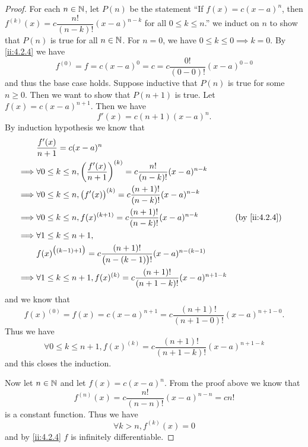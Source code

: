 \begin{proof}
  For each \(n \in \mathbb{N}\), let \(P(n)\) be the statement ``If \(f(x) = c (x - a)^n\), then \(f^{(k)}(x) = c \dfrac{n!}{(n - k)!} (x - a)^{n - k}\) for all \(0 \leq k \leq n\).''
  we induct on \(n\) to show that \(P(n)\) is true for all \(n \in \mathbb{N}\).
  For \(n = 0\), we have \(0 \leq k \leq 0 \implies k = 0\).
  By \cref{ii:4.2.4} we have
  \[
    f^{(0)} = f = c (x - a)^0 = c = c \dfrac{0!}{(0 - 0)!} (x - a)^{0 - 0}
  \]
  and thus the base case holds.
  Suppose inductive that \(P(n)\) is true for some \(n \geq 0\).
  Then we want to show that \(P(n + 1)\) is true.
  Let \(f(x) = c (x - a)^{n + 1}\).
  Then we have
  \[
    f'(x) = c (n + 1) (x - a)^n.
  \]
  By induction hypothesis we know that
  \begin{align*}
             & \dfrac{f'(x)}{n + 1} = c (x - a)^n                                                                                          \\
    \implies & \forall 0 \leq k \leq n, \bigg(\dfrac{f'(x)}{n + 1}\bigg)^{(k)} = c \dfrac{n!}{(n - k)!} (x - a)^{n - k}                    \\
    \implies & \forall 0 \leq k \leq n, \big(f'(x)\big)^{(k)} = c \dfrac{(n + 1)!}{(n - k)!} (x - a)^{n - k}                               \\
    \implies & \forall 0 \leq k \leq n, f(x)^{(k + 1)} = c \dfrac{(n + 1)!}{(n - k)!} (x - a)^{n - k}                   &  & \by{ii:4.2.4} \\
    \implies & \forall 1 \leq k \leq n + 1,                                                                                                \\
             & f(x)^{\big((k - 1) + 1\big)} = c \dfrac{(n + 1)!}{\big(n - (k - 1)\big)!} (x - a)^{n - (k - 1)}                             \\
    \implies & \forall 1 \leq k \leq n + 1, f(x)^{(k)} = c \dfrac{(n + 1)!}{(n + 1 - k)!} (x - a)^{n + 1 - k}
  \end{align*}
  and we know that
  \[
    f(x)^{(0)} = f(x) = c (x - a)^{n + 1} = c \dfrac{(n + 1)!}{(n + 1 - 0)!} (x - a)^{n + 1 - 0}.
  \]
  Thus we have
  \[
    \forall 0 \leq k \leq n + 1, f(x)^{(k)} = c \dfrac{(n + 1)!}{(n + 1 - k)!} (x - a)^{n + 1 - k}
  \]
  and this closes the induction.

  Now let \(n \in \mathbb{N}\) and let \(f(x) = c (x - a)^n\).
  From the proof above we know that
  \[
    f^{(n)}(x) = c \dfrac{n!}{(n - n)!} (x - a)^{n - n} = c n!
  \]
  is a constant function.
  Thus we have
  \[
    \forall k > n, f^{(k)}(x) = 0
  \]
  and by \cref{ii:4.2.4} \(f\) is infinitely differentiable.
\end{proof}

